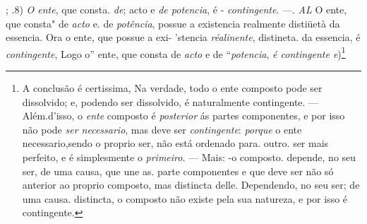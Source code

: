 ; .8) \emph{O ente}, que consta. \emph{de}; acto e \emph{de potencia}, é - \emph{contingente}. ---. \emph{AL} O ente, que consta" de \emph{acto} e. de \emph{potência}, possue a existencia realmente distiüetà da essencia. Ora o ente, que possue a exi- 'stencia \emph{réalinente}, distineta. da essencia, é \emph{contingente}, Logo o” ente, que consta de \emph{acto} e de “\emph{potencia}, \emph{é contingente e})\footnote{A conclusão é certissima, Na verdade, todo o ente composto pode ser dissolvido; e, podendo ser dissolvido, é naturalmente contingente. --- Além.d'isso, o \emph{ente} composto é \emph{posterior} ás partes componentes, e por isso não pode \emph{ser necessario}, mas deve ser \emph{contingente}: \emph{porque} o ente necessario,sendo o proprio ser, não está ordenado para. outro. ser mais perfeito, e é simplesmente o \emph{primeiro}. --- Mais: -o composto. depende, no seu ser, de uma causa, que une as. parte componentes e que deve ser não só anterior ao proprio composto, mas distincta delle. Dependendo, no seu ser; de uma causa. distincta, o composto não existe pela sua natureza, e por isso é contingente.} 